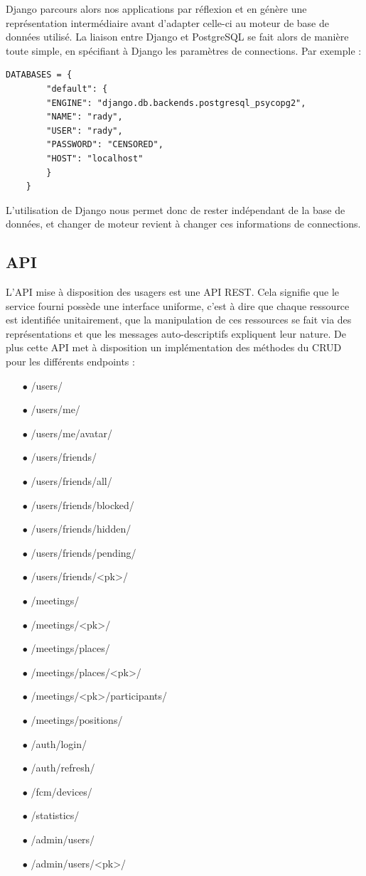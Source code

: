\documentclass[french]{article}
\begin{document}
	Django parcours alors nos applications par réflexion et en génère une représentation intermédiaire avant d'adapter celle-ci au moteur de base de données utilisé. La liaison entre Django et PostgreSQL se fait alors de manière toute simple, en spécifiant à Django les paramètres de connections. Par exemple :
	
	\begin{lstlisting}[style=py]
	DATABASES = {
		"default": {
		"ENGINE": "django.db.backends.postgresql_psycopg2",
		"NAME": "rady",
		"USER": "rady",
		"PASSWORD": "CENSORED",
		"HOST": "localhost"
		}
	}
	\end{lstlisting}
	
	L'utilisation de Django nous permet donc de rester indépendant de la base de données, et changer de moteur revient à changer ces informations de connections.
	
	
	\subsection{API}
	
	L'API mise à disposition des usagers est une API REST. Cela signifie que le service fourni possède une interface uniforme, c'est à dire que chaque ressource est identifiée unitairement, que la manipulation de ces ressources se fait via des représentations et que les messages auto-descriptifs expliquent leur nature. De plus cette API met à disposition un implémentation des méthodes du CRUD pour les différents endpoints : 
	\begin{itemize}
		\item[$\bullet$] /users/
		\item[$\bullet$] /users/me/
		\item[$\bullet$] /users/me/avatar/
		\item[$\bullet$] /users/friends/
		\item[$\bullet$] /users/friends/all/
		\item[$\bullet$] /users/friends/blocked/
		\item[$\bullet$] /users/friends/hidden/
		\item[$\bullet$] /users/friends/pending/
		\item[$\bullet$] /users/friends/<pk>/
		\item[$\bullet$] /meetings/
		\item[$\bullet$] /meetings/<pk>/
		\item[$\bullet$] /meetings/places/
		\item[$\bullet$] /meetings/places/<pk>/
		\item[$\bullet$] /meetings/<pk>/participants/
		\item[$\bullet$] /meetings/positions/
		\item[$\bullet$] /auth/login/
		\item[$\bullet$] /auth/refresh/
		\item[$\bullet$] /fcm/devices/
		\item[$\bullet$] /statistics/
		\item[$\bullet$] /admin/users/
		\item[$\bullet$] /admin/users/<pk>/
	\end{itemize}
		
\end{document}
